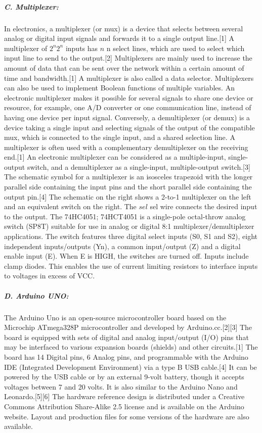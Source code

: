 \subparagraph{C. Multiplexer: }
In electronics, a multiplexer (or mux) is a device that selects between several analog 
or digital input signals and forwards it to a single output line.[1] A multiplexer of 
${\displaystyle 2^{n}} 2^{n}$ inputs has ${\displaystyle n}$ n select lines, which are 
used to select which input line to send to the output.[2] Multiplexers are mainly used 
to increase the amount of data that can be sent over the network within a certain amount 
of time and bandwidth.[1] A multiplexer is also called a data selector. Multiplexers can 
also be used to implement Boolean functions of multiple variables.
An electronic multiplexer makes it possible for several signals to share one device or 
resource, for example, one A/D converter or one communication line, instead of having one 
device per input signal.
Conversely, a demultiplexer (or demux) is a device taking a single input and selecting 
signals of the output of the compatible mux, which is connected to the single input, and 
a shared selection line. A multiplexer is often used with a complementary demultiplexer 
on the receiving end.[1]
An electronic multiplexer can be considered as a multiple-input, single-output switch, 
and a demultiplexer as a single-input, multiple-output switch.[3] The schematic symbol 
for a multiplexer is an isosceles trapezoid with the longer parallel side containing the 
input pins and the short parallel side containing the output pin.[4] The schematic on the 
right shows a 2-to-1 multiplexer on the left and an equivalent switch on the right. 
The ${\displaystyle sel}$ sel wire connects the desired input to the output.
The 74HC4051; 74HCT4051 is a single-pole octal-throw analog switch (SP8T) suitable for 
use in analog or digital 8:1 multiplexer/demultiplexer applications. The switch features 
three digital select inputs (S0, S1 and S2), eight independent inputs/outputs (Yn), a 
common input/output (Z) and a digital enable input (E). When E is HIGH, the switches are 
turned off. Inputs include clamp diodes. This enables the use of current limiting resistors 
to interface inputs to voltages in excess of VCC.

\subparagraph{D. Arduino UNO: }
The Arduino Uno is an open-source microcontroller board based on the Microchip ATmega328P 
microcontroller and developed by Arduino.cc.[2][3] The board is equipped with sets of digital 
and analog input/output (I/O) pins that may be interfaced to various expansion boards (shields) 
and other circuits.[1] The board has 14 Digital pins, 6 Analog pins, and programmable with 
the Arduino IDE (Integrated Development Environment) via a type B USB cable.[4] It can be 
powered by the USB cable or by an external 9-volt battery, though it accepts voltages between 
7 and 20 volts. It is also similar to the Arduino Nano and Leonardo.[5][6] The hardware 
reference design is distributed under a Creative Commons Attribution Share-Alike 2.5 license 
and is available on the Arduino website. Layout and production files for some versions of 
the hardware are also available.

